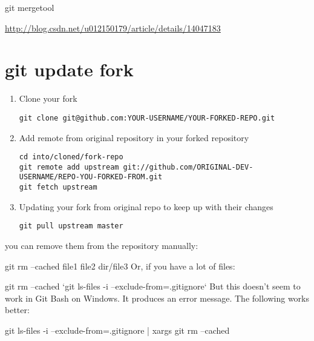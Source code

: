 \documentclass[10pt,a4paper]{article}
\begin{document}
git mergetool

\url{http://blog.csdn.net/u012150179/article/details/14047183}

\section{git update fork}

\begin{enumerate}
\item Clone your fork
\begin{lstlisting}
git clone git@github.com:YOUR-USERNAME/YOUR-FORKED-REPO.git
\end{lstlisting}

\item Add remote from original repository in your forked repository
\begin{lstlisting}
cd into/cloned/fork-repo
git remote add upstream git://github.com/ORIGINAL-DEV-USERNAME/REPO-YOU-FORKED-FROM.git
git fetch upstream
\end{lstlisting}

\item Updating your fork from original repo to keep up with their changes
\begin{lstlisting}
git pull upstream master
\end{lstlisting}
\end{enumerate}



you can remove them from the repository manually:

git rm --cached file1 file2 dir/file3
Or, if you have a lot of files:

git rm --cached `git ls-files -i --exclude-from=.gitignore`
But this doesn't seem to work in Git Bash on Windows. It produces an error message. The following works better:

git ls-files -i --exclude-from=.gitignore | xargs git rm --cached  
\end{document}
